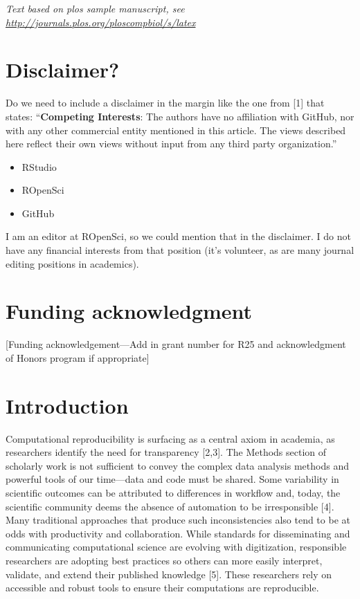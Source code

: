 \documentclass[10pt,letterpaper]{article}
\providecommand{\tightlist}{%
  \setlength{\itemsep}{0pt}\setlength{\parskip}{0pt}}
\begin{document}
\linenumbers

\emph{Text based on plos sample manuscript, see
\url{http://journals.plos.org/ploscompbiol/s/latex}}

\hypertarget{disclaimer}{%
\section{Disclaimer?}\label{disclaimer}}

Do we need to include a disclaimer in the margin like the one from
{[}1{]} that states: ``\textbf{Competing Interests}: The authors have no
affiliation with GitHub, nor with any other commercial entity mentioned
in this article. The views described here reflect their own views
without input from any third party organization.''

\begin{itemize}
\tightlist
\item
  RStudio
\item
  ROpenSci
\item
  GitHub
\end{itemize}

I am an editor at ROpenSci, so we could mention that in the disclaimer.
I do not have any financial interests from that position (it's
volunteer, as are many journal editing positions in academics).

\hypertarget{funding-acknowledgment}{%
\section{Funding acknowledgment}\label{funding-acknowledgment}}

{[}Funding acknowledgement---Add in grant number for R25 and
acknowledgment of Honors program if appropriate{]}

\hypertarget{introduction}{%
\section{Introduction}\label{introduction}}

Computational reproducibility is surfacing as a central axiom in
academia, as researchers identify the need for transparency {[}2,3{]}.
The Methods section of scholarly work is not sufficient to convey the
complex data analysis methods and powerful tools of our time---data and
code must be shared. Some variability in scientific outcomes can be
attributed to differences in workflow and, today, the scientific
community deems the absence of automation to be irresponsible {[}4{]}.
Many traditional approaches that produce such inconsistencies also tend
to be at odds with productivity and collaboration. While standards for
disseminating and communicating computational science are evolving with
digitization, responsible researchers are adopting best practices so
others can more easily interpret, validate, and extend their published
knowledge {[}5{]}. These researchers rely on accessible and robust tools
to ensure their computations are reproducible.
\end{document}
